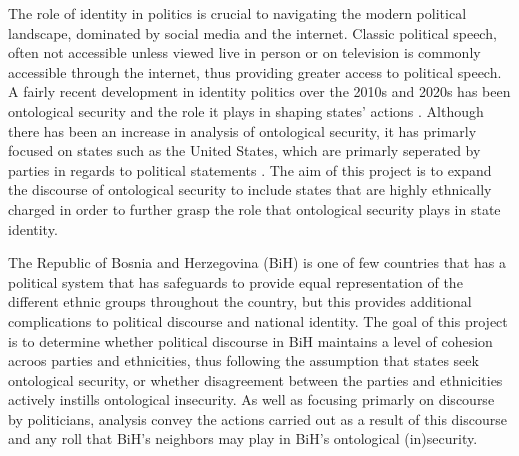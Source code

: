 

The role of identity in politics is crucial to navigating the modern political landscape, dominated by social media and the internet. Classic political speech, often not accessible unless viewed live in person or on television is commonly accessible through the internet, thus providing greater access to political speech. A fairly recent development in identity politics over the 2010s and 2020s has been ontological security and the role it plays in shaping states' actions \Parencites{mitzenOntologicalSecurityWorld2006}{kocanIdentityOntologicalSecurity2023}{davidPolicingMemoryBosnia2019}. Although there has been an increase in analysis of ontological security, it has primarly focused on states such as the United States, which are primarly seperated by parties in regards to political statements \parencite{mitzenOntologicalSecurityWorld2006}. The aim of this project is to expand the discourse of ontological security to include states that are highly ethnically charged in order to further grasp the role that ontological security plays in state identity.

The Republic of Bosnia and Herzegovina (BiH) is one of few countries that has a political system that has safeguards to provide equal representation of the different ethnic groups throughout the country, but this provides additional complications to political discourse and national identity. The goal of this project is to determine whether political discourse in BiH maintains a level of cohesion acroos parties and ethnicities, thus following the assumption that states seek ontological security, or whether disagreement between the parties and ethnicities actively instills ontological insecurity. As well as focusing primarly on discourse by politicians, analysis convey the actions carried out as a result of this discourse and any roll that BiH's neighbors may play in BiH's ontological (in)security.




